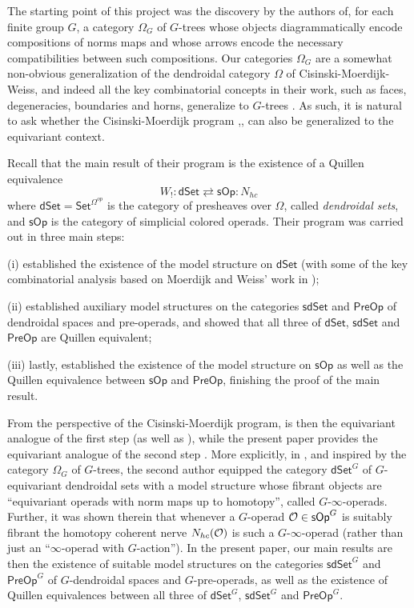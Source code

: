 \documentclass[a4paper,10pt
,draft
]{article}%
\begin{document}
The starting point of this project was the discovery by the authors of,
for each finite group $G$,
a category $\Omega_G$ of $G$-trees whose objects diagrammatically encode compositions of norms maps 
and whose arrows encode the necessary compatibilities between such compositions.
Our categories $\Omega_G$ are a somewhat non-obvious  generalization of the dendroidal category $\Omega$
of Cisinski-Moerdijk-Weiss, 
and indeed all the key combinatorial concepts in their work,
such as faces, degeneracies, boundaries and horns, generalize to $G$-trees \cite[\S 5,6]{Per17}.
As such, it is natural to ask whether the Cisinski-Moerdijk program \cite{CM11},\cite{CM13a},\cite{CM13b} can also be generalized to the equivariant context. 

Recall that the main result of their program is the existence of a Quillen equivalence
\[
	W_{!} \colon \mathsf{dSet} 
		\rightleftarrows
	\mathsf{sOp}  \colon N_{hc} 
\]
where $\mathsf{dSet} = \mathsf{Set}^{\Omega^{op}} $
is the category of presheaves over $\Omega$, 
called \textit{dendroidal sets},
and 
$\mathsf{sOp}$ is the category of simplicial colored operads.
Their program was carried out in three main steps:
\begin{inparaenum}
	\item[(i)] \cite{CM11} established the existence of the model structure on $\mathsf{dSet}$
	(with some of the key combinatorial analysis based on Moerdijk and Weiss' work in \cite{MW09});
	\item[(ii)] \cite{CM13a} established auxiliary model structures on the categories $\mathsf{sdSet}$ and $\mathsf{PreOp}$
	of dendroidal spaces and pre-operads, and showed that all three of $\mathsf{dSet}$, $\mathsf{sdSet}$ and $\mathsf{PreOp}$ are Quillen equivalent;
	\item[(iii)] lastly, \cite{CM13b} established the existence of the model structure on $\mathsf{sOp}$ as well as the Quillen equivalence between $\mathsf{sOp}$ and $\mathsf{PreOp}$, finishing the proof of the main result.
\end{inparaenum}

From the perspective of the Cisinski-Moerdijk program, 
\cite{Per17} is then the equivariant analogue of the first step \cite{CM11} (as well as \cite{MW09}), 
while the present paper provides the equivariant analogue of the
second step \cite{CM13a}.
More explicitly, in \cite{Per17}, and inspired by the category $\Omega_G$ of $G$-trees,
the second author equipped the category
$\mathsf{dSet}^G$ of $G$-equivariant dendroidal sets with a model structure whose fibrant objects 
are ``equivariant operads with norm maps up to homotopy'',
called $G$-$\infty$-operads.
Further, it was shown therein that whenever a $G$-operad
$\mathcal{O} \in \mathsf{sOp}^G$ is
suitably fibrant the homotopy coherent nerve
$N_{hc}(\mathcal{O})$ is such a 
$G$-$\infty$-operad (rather than just an ``$\infty$-operad with $G$-action'').
In the present paper, our main results are then the existence of suitable model structures on the categories 
$\mathsf{sdSet}^G$ and $\mathsf{PreOp}^G$
of $G$-dendroidal spaces and $G$-pre-operads,
as well as the existence of Quillen equivalences
between all three of 
$\mathsf{dSet}^G$, $\mathsf{sdSet}^G$ and $\mathsf{PreOp}^G$.
\end{document}
